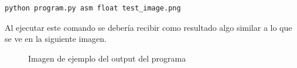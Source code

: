 \begin{lstlisting}[frame=single]
python program.py asm float test_image.png
\end{lstlisting}


Al ejecutar este comando se debería recibir como resultado algo similar a lo que se ve en la siguiente imagen.

\fboxsep=1mm%
\fboxrule=2pt%

\begin{figure}[H]
\centering
\caption{Imagen de ejemplo del output del programa}
\centering
\end{figure}

